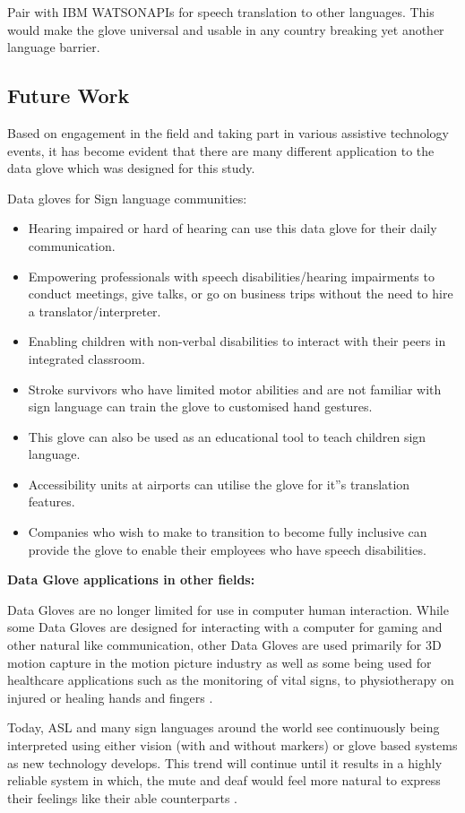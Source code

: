 Pair with IBM WATSON\texttrademark APIs for speech translation to other languages. This would make the glove universal and usable in any country breaking yet another language barrier.

\subsection{Future Work}

Based on engagement in the field and taking part in various assistive technology events, it has become evident that there are many different application to the data glove which was designed for this study.

Data gloves for Sign language communities:

\begin{itemize}
    \item Hearing impaired or hard of hearing can use this data glove for their daily communication. 
    \item Empowering professionals with speech disabilities/hearing impairments to conduct meetings, give talks, or go on business trips without the need to hire a translator/interpreter. 
    \item Enabling children with non-verbal disabilities to interact with their peers in integrated classroom. 
    \item Stroke survivors who have limited motor abilities and are not familiar with sign language can train the glove to customised hand gestures. 
    \item This glove can also be used as an educational tool to teach children sign language. 
    \item Accessibility units at airports can utilise the glove for it''s translation features.
    \item Companies who wish to make to transition to become fully inclusive can provide the glove to enable their employees who have speech disabilities. 
\end{itemize}

\textbf{Data Glove applications in other fields:}

Data Gloves are no longer limited for use in computer human interaction. While some Data Gloves are designed for interacting with a computer for gaming and other natural like communication, other Data Gloves are used primarily for 3D motion capture in the motion picture industry as well as some being used for healthcare applications such as the monitoring of vital signs, to physiotherapy on injured or healing hands and fingers \parencite{Premaratne2010}. 

Today, ASL and many sign languages around the world see continuously being interpreted using either vision (with and without markers) or glove based systems as new technology develops. This trend will continue until it results in a highly reliable system in which, the mute and deaf would feel more natural to express their feelings like their able counterparts \parencite{Pavlovic1997}.





